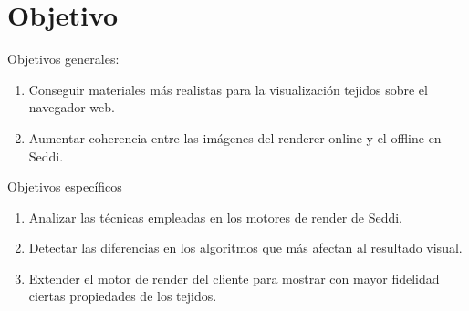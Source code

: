 \chapter{Objetivo}

Objetivos generales:
\begin{enumerate}
    \item Conseguir materiales m\'as realistas para la visualizaci\'on tejidos sobre el navegador web.
    \item Aumentar coherencia entre las im\'agenes del renderer online y el offline en Seddi.
\end{enumerate}

Objetivos espec\'ificos
\begin{enumerate}
    \item Analizar las t\'ecnicas empleadas en los motores de render de Seddi. 
    \item Detectar las diferencias en los algoritmos que m\'as afectan al resultado visual.
    \item Extender el motor de render del cliente para mostrar con mayor fidelidad ciertas propiedades
          de los tejidos.
  \end{enumerate}
